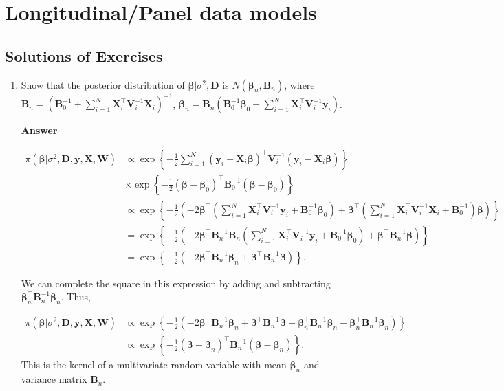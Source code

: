 \chapter{Longitudinal/Panel data models}\label{chap9}

\section{Solutions of Exercises}\label{sec91}
\begin{enumerate}[leftmargin=*]

	\item Show that the posterior distribution of $\bm{\beta}|\sigma^2,\bm{D}$ is $N(\bm{\beta}_n,\bm{B}_n)$, where $\bm{B}_n = (\bm{B}_0^{-1} +\sum_{i=1}^N \bm{X}_i^{\top}\bm{V}_i^{-1}\bm{X}_i)^{-1}$, $\bm{\beta}_n= \bm{B}_n(\bm{B}_0^{-1}\bm{\beta}_0 + \sum_{i=1}^N\bm{X}_i^{\top}\bm{V}_i^{-1}\bm{y}_i)$.
	
	\textbf{Answer}

{\footnotesize	
	\begin{align*}
		\pi(\bm{\beta}|\sigma^2, \bm{D},\bm{y},\bm{X},\bm{W}) & \propto \exp\left\{-\frac{1}{2}\sum_{i=1}^N(\bm{y}_i-\bm{X}_i\bm{\beta})^{\top}\bm{V}_i^{-1}(\bm{y}_i-\bm{X}_i\bm{\beta})\right\}\\
		&\times \exp\left\{-\frac{1}{2}(\bm{\beta}-\bm{\beta}_0)^{\top}\bm{B}_0^{-1}(\bm{\beta}-\bm{\beta}_0)\right\}\\
		& \propto \exp\left\{-\frac{1}{2}\left(-2\bm{\beta}^{\top}\left(\sum_{i=1}^N\bm{X}_i^{\top}\bm{V}_i^{-1}\bm{y}_i+\bm{B}_0^{-1}\bm{\beta}_0\right)+\bm{\beta}^{\top}\left(\sum_{i=1}^N\bm{X}_i^{\top}\bm{V}_i^{-1}\bm{X}_i+\bm{B}_0^{-1}\right)\bm{\beta}\right)\right\}\\
		& = \exp\left\{-\frac{1}{2}(-2\bm{\beta}^{\top}\bm{B}_n^{-1}\bm{B}_n\left(\sum_{i=1}^N\bm{X}_i^{\top}\bm{V}_i^{-1}\bm{y}_i+\bm{B}_0^{-1}\bm{\beta}_0\right)+\bm{\beta}^{\top}\bm{B}_n^{-1}\bm{\beta})\right\}\\
		& = \exp\left\{-\frac{1}{2}(-2\bm{\beta}^{\top}\bm{B}_n^{-1}\bm{\beta}_n+\bm{\beta}^{\top}\bm{B}_n^{-1}\bm{\beta})\right\}. 
	\end{align*} 
}

We can complete the square in this expression by adding and subtracting $\bm{\beta}_n^{\top}\bm{B}_n^{-1}\bm{\beta}_n$. Thus,

	\begin{align*}
	\pi(\bm{\beta}|\sigma^2, \bm{D},\bm{y},\bm{X},\bm{W}) & \propto \exp\left\{-\frac{1}{2}(-2\bm{\beta}^{\top}\bm{B}_n^{-1}\bm{\beta}_n+\bm{\beta}^{\top}\bm{B}_n^{-1}\bm{\beta}+\bm{\beta}_n^{\top}\bm{B}_n^{-1}\bm{\beta}_n-\bm{\beta}_n^{\top}\bm{B}_n^{-1}\bm{\beta}_n)\right\}\\
	&\propto \exp\left\{-\frac{1}{2}(\bm{\beta}-\bm{\beta}_n)^{\top}\bm{B}_n^{-1}(\bm{\beta}-\bm{\beta}_n)\right\}.
\end{align*} 
This is the kernel of a multivariate random variable with mean $\bm{\beta}_n$ and variance matrix $\bm{B}_n$.
	

\end{enumerate}
